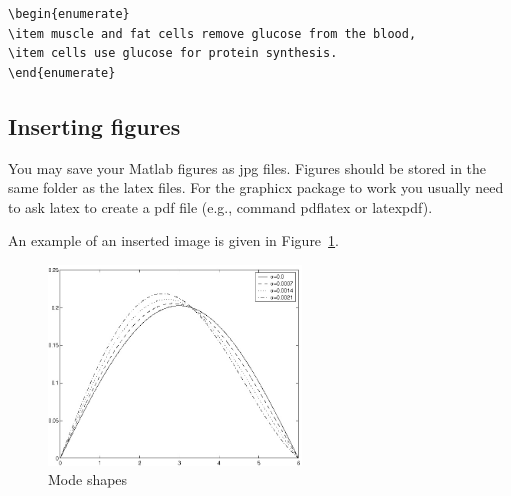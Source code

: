 \documentclass[11pt]{book}
\begin{document}
\begin{verbatim}
\begin{enumerate}
\item muscle and fat cells remove glucose from the blood,
\item cells use glucose for protein synthesis.
\end{enumerate}
\end{verbatim}



\newpage



\subsection{Inserting figures}


You may save your Matlab figures as jpg files.  Figures should  be stored in the 
same folder as the latex files.
For the graphicx package to work you usually need to ask latex to create a pdf file (e.g., command pdflatex or latexpdf).

An example of an inserted image is given in Figure~\ref{fig:modes}.

\begin{center}
\begin{figure}[h]
		\centering
		\includegraphics[width=0.6\textwidth]{modes}
		\caption{Mode shapes}
		\label{fig:modes}
\end{figure}
\end{center}




 
\end{document}
